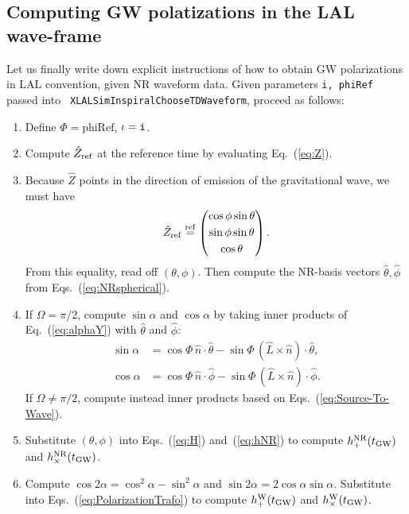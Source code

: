 \documentclass[aps,prd,amssymb,amsmath,amsfonts,superscriptaddress,
floatfix ,preprintnumbers,altaffilletter]{revtex4}
\newcommand{\tNR}{\theta}
\newcommand{\pNR}{\phi}
\newcommand{\EtNR}{{\hat\theta}}
\newcommand{\EpNR}{{\hat\phi}}
\newcommand{\hpNR}{h_+^{\rm NR}}
\newcommand{\hcNR}{h_{\times}^{\rm NR}}
\newcommand{\nNR}{\hat{n}}
\newcommand{\lNR}{\hat L}
\newcommand{\tGW}{t_{\rm GW}}
\newcommand{\EzW}{\hat Z}
\newcommand{\hpW}{h_+^{\rm W}}
\newcommand{\hcW}{h_\times^{\rm W}}
\newcommand{\phiRef}{\Phi} %
\newcommand{\equalref}{\overset{\rm ref}{=}}
\begin{document}
\subsection{Computing GW polatizations in the LAL wave-frame}
\label{sec:NR-LAL-Trafo}

Let us finally write down explicit instructions of how to obtain GW
polarizations in LAL convention, given NR waveform data.  
Given parameters {\tt i, phiRef} passed into {\tt
  XLALSimInspiralChooseTDWaveform}, proceed as follows:

\begin{enumerate}
\item Define $\phiRef=\mbox{phiRef}$, $\iota={\tt i}$.
\item Compute $\EzW_{\rm ref}$ at the reference time by evaluating Eq.~(\ref{eq:Z}).
\item Because $\EzW$ points in the direction of emission of the
gravitational wave, we must have
\begin{equation}
  \EzW_{\rm ref} \equalref
  \left(\begin{gathered}
    \cos\pNR\sin\tNR\\
    \sin\pNR\sin\tNR\\
    \cos\tNR\end{gathered}
    \right).
\end{equation}
From this equality, read off $(\tNR, \pNR)$.  Then compute the
NR-basis vectors $\EtNR, \EpNR$ from Eqs.~(\ref{eq:NRspherical}).
\item If $\Omega=\pi/2$, compute $\sin\alpha$ and $\cos\alpha$ by taking inner products
  of Eq.~(\ref{eq:alphaY}) with $\EtNR$ and $\EpNR$:
  \begin{subequations}
  \begin{align}
    \sin\alpha& = \cos\phiRef\,\nNR\cdot\EtNR- \sin\phiRef\,(\lNR\times\nNR)\cdot\EtNR,\\
    \cos\alpha& = \cos\phiRef\,\nNR\cdot\EpNR - \sin\phiRef\,(\lNR\times\nNR)\cdot\EpNR.
  \end{align}
\end{subequations}
  If $\Omega\neq \pi/2$, compute instead inner products based on
  Eqs.~(\ref{eq:Source-To-Wave}).
\item Substitute $(\tNR, \pNR)$ into Eqs.~(\ref{eq:H})
  and~(\ref{eq:hNR}) to compute $\hpNR(\tGW)$ and $\hcNR(\tGW)$.
\item Compute $\cos 2\alpha=\cos^2\alpha\!-\!\sin^2\alpha$ and $\sin 2\alpha=2\cos\alpha\sin\alpha$.  Substitute into Eqs.~(\ref{eq:PolarizationTrafo}) to compute $\hpW(\tGW)$ and $\hcW(\tGW)$.
\end{enumerate}
\end{document}
